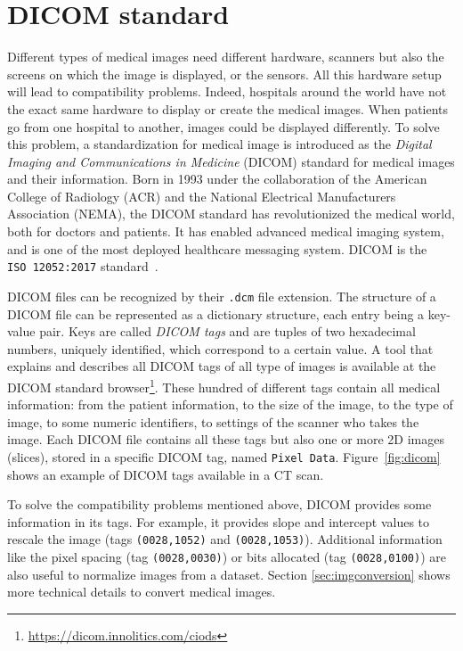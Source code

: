 \section{DICOM standard}
\label{sec:dicom}
Different types of medical images need different hardware, scanners but also the screens on which the image is displayed, or the sensors. All this hardware setup will lead to compatibility problems. Indeed, hospitals around the world have not the exact same hardware to display or create the medical images. When patients go from one hospital to another, images could be displayed differently. To solve this problem, a standardization for medical image is introduced as the \emph{Digital Imaging and Communications in Medicine} (DICOM) standard for medical images and their information. Born in 1993 under the collaboration of the American College of Radiology (ACR) and the National Electrical Manufacturers Association (NEMA), the DICOM standard has revolutionized the medical world, both for doctors and patients. It has enabled advanced medical imaging system, and is one of the most deployed healthcare messaging system. DICOM is the \texttt{ISO~12052:2017} standard~\cite{mildenberger_introduction_2002}.

DICOM files can be recognized by their \texttt{.dcm} file extension. The structure of a \mbox{DICOM} file can be represented as a dictionary structure, each entry being a \mbox{key-value} pair. Keys are called \emph{DICOM tags} and are tuples of two hexadecimal numbers, uniquely identified, which correspond to a certain value. A tool that explains and describes all DICOM tags of all type of images is available at the DICOM standard browser\footnote{\url{https://dicom.innolitics.com/ciods}}. These hundred of different tags contain all medical information: from the patient information, to the size of the image, to the type of image, to some numeric identifiers, to settings of the scanner who takes the image. Each DICOM file contains all these tags but also one or more 2D images (slices), stored in a specific DICOM tag, named \texttt{Pixel Data}. Figure~\ref{fig:dicom} shows an example of DICOM tags available in a CT scan.

To solve the compatibility problems mentioned above, DICOM provides some information in its tags. For example, it provides slope and intercept values to rescale the image (tags \texttt{(0028,1052)} and \texttt{(0028,1053)}). Additional information like the pixel spacing (tag \texttt{(0028,0030)}) or bits allocated (tag \texttt{(0028,0100)}) are also useful to normalize images from a dataset. Section \ref{sec:imgconversion} shows more technical details to convert medical images.

